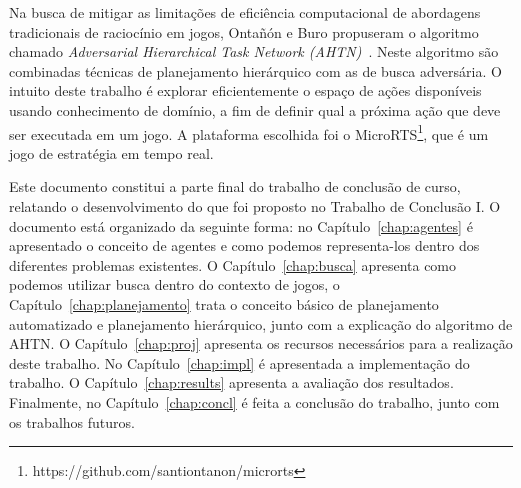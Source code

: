 Na busca de mitigar as limitações de eficiência computacional de abordagens tradicionais de raciocínio em jogos, Ontañón e Buro propuseram o algoritmo chamado \textit{Adversarial Hierarchical Task Network (AHTN)}~\cite{ontanon2015adversarial}. 
Neste algoritmo são combinadas técnicas de planejamento hierárquico com as de busca adversária. 
O intuito deste trabalho é explorar eficientemente o espaço de ações disponíveis usando conhecimento de domínio, a fim de definir qual a próxima ação que deve ser executada em um jogo. 
A plataforma escolhida foi o MicroRTS\footnote{https://github.com/santiontanon/microrts}, que é um jogo de estratégia em tempo real. 

Este documento constitui a parte final do trabalho de conclusão de curso, relatando o desenvolvimento do que foi proposto no Trabalho de Conclusão I. 
O documento está organizado da seguinte forma: no Capítulo~\ref{chap:agentes} é apresentado o conceito de agentes e como podemos representa-los dentro dos diferentes problemas existentes.
O Capítulo~\ref{chap:busca} apresenta como podemos utilizar busca dentro do contexto de jogos, o Capítulo~\ref{chap:planejamento} trata o conceito básico de planejamento automatizado e planejamento hierárquico, junto com a explicação do algoritmo de AHTN. 
O Capítulo~\ref{chap:proj} apresenta os recursos necessários para a realização deste trabalho.
No Capítulo~\ref{chap:impl} é apresentada a implementação do trabalho.
O Capítulo~\ref{chap:results} apresenta a avaliação dos resultados.
Finalmente, no Capítulo~\ref{chap:concl} é feita a conclusão do trabalho, junto com os trabalhos futuros.